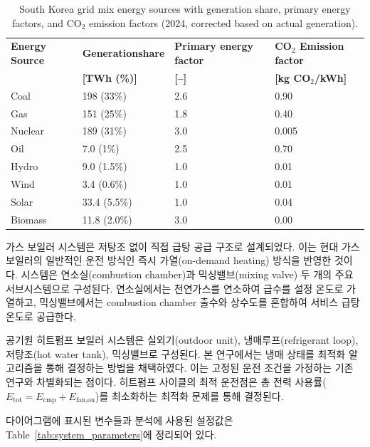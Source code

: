 \documentclass[final,5p,times,twocolumn,authoryear]{elsarticle}
\begin{document}
\begin{table}[t]
\centering
\caption{South Korea grid mix energy sources with generation share, primary energy factors, and CO$_2$ emission factors (2024, corrected based on actual generation).}
\label{tab:grid_mix_korea}
\renewcommand{\arraystretch}{1.2}
\small
\begin{tabularx}{\columnwidth}{l X X X}
\toprule
\textbf{Energy Source} & \textbf{Generationshare} & \textbf{Primary energy factor} & \textbf{CO$_2$ Emission factor} \\
 & \textbf{[TWh (\%)]} & \textbf{[--]} & \textbf{[kg CO$_2$/kWh]} \\
\midrule
Coal & 198 (33\%) & 2.6 & 0.90 \\
Gas & 151 (25\%) & 1.8 & 0.40 \\
Nuclear & 189 (31\%) & 3.0 & 0.005 \\
Oil & 7.0 (1\%) & 2.5 & 0.70 \\
Hydro & 9.0 (1.5\%) & 1.0 & 0.01 \\
Wind & 3.4 (0.6\%) & 1.0 & 0.01 \\
Solar & 33.4 (5.5\%) & 1.0 & 0.04 \\
Biomass & 11.8 (2.0\%) & 3.0 & 0.00 \\
\bottomrule
\end{tabularx}
\end{table}

가스 보일러 시스템은 저탕조 없이 직접 급탕 공급 구조로 설계되었다. 이는 현대 가스 보일러의 일반적인 운전 방식인 즉시 가열(on-demand heating) 방식을 반영한 것이다. 시스템은 연소실(combustion chamber)과 믹싱밸브(mixing valve) 두 개의 주요 서브시스템으로 구성된다. 연소실에서는 천연가스를 연소하여 급수를 설정 온도로 가열하고, 믹싱밸브에서는 combustion chamber 출수와 상수도를 혼합하여 서비스 급탕 온도로 공급한다.

공기원 히트펌프 보일러 시스템은 실외기(outdoor unit), 냉매루프(refrigerant loop), 저탕조(hot water tank), 믹싱밸브로 구성된다. 본 연구에서는 냉매 상태를 최적화 알고리즘을 통해 결정하는 방법을 채택하였다. 이는 고정된 운전 조건을 가정하는 기존 연구와 차별화되는 점이다. 히트펌프 사이클의 최적 운전점은 총 전력 사용률($E_{\text{tot}} = E_{\text{cmp}} + E_{\text{fan,ou}}$)를 최소화하는 최적화 문제를 통해 결정된다.

다이어그램에 표시된 변수들과 분석에 사용된 설정값은 Table~\ref{tab:system_parameters}에 정리되어 있다.
\end{document}
